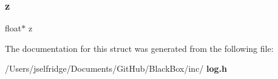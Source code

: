 \mbox{\label{structlog__df__struct_a4aae6a4d23b364f8f58ad85032e70bf4}} 
\subsubsection{z}
{\footnotesize\ttfamily float$\ast$ z}



The documentation for this struct was generated from the following file\+:\begin{DoxyCompactItemize}
\item 
/\+Users/jselfridge/\+Documents/\+Git\+Hub/\+Black\+Box/inc/\textbf{ log.\+h}\end{DoxyCompactItemize}
